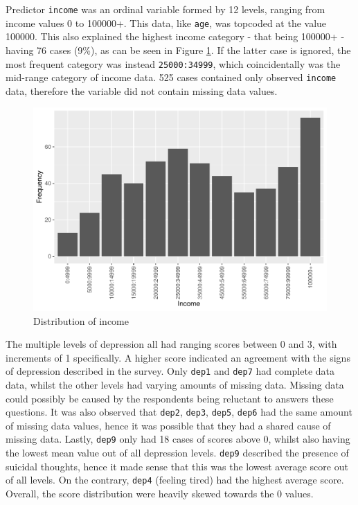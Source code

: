 \documentclass[
]{article}
\begin{document}
Predictor \texttt{income} was an ordinal variable formed by 12 levels, ranging from income values 0 to 100000+. This data, like \texttt{age}, was topcoded at the value 100000. This also explained the highest income category - that being 100000+ - having 76 cases (9\%), as can be seen in Figure \ref{fig:income-dist}. If the latter case is ignored, the most frequent category was instead \texttt{25000:34999}, which coincidentally was the mid-range category of income data. 525 cases contained only observed \texttt{income} data, therefore the variable did not contain missing data values.

\begin{figure}
\centering
\includegraphics{report_files/figure-latex/income-dist-1.pdf}
\caption{\label{fig:income-dist}Distribution of income}
\end{figure}

The multiple levels of depression all had ranging scores between 0 and 3, with increments of 1 specifically. A higher score indicated an agreement with the signs of depression described in the survey. Only \texttt{dep1} and \texttt{dep7} had complete data data, whilst the other levels had varying amounts of missing data. Missing data could possibly be caused by the respondents being reluctant to answers these questions. It was also observed that \texttt{dep2}, \texttt{dep3}, \texttt{dep5}, \texttt{dep6} had the same amount of missing data values, hence it was possible that they had a shared cause of missing data. Lastly, \texttt{dep9} only had 18 cases of scores above 0, whilst also having the lowest mean value out of all depression levels. \texttt{dep9} described the presence of suicidal thoughts, hence it made sense that this was the lowest average score out of all levels. On the contrary, \texttt{dep4} (feeling tired) had the highest average score. Overall, the score distribution were heavily skewed towards the 0 values.
\end{document}
